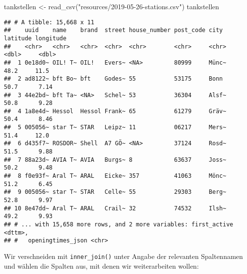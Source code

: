 \documentclass[
  ngerman,
]{article}
\newenvironment{Shaded}{\begin{snugshade}}{\end{snugshade}}
\newcommand{\FunctionTok}[1]{\textcolor[rgb]{0.00,0.00,0.00}{#1}}
\newcommand{\NormalTok}[1]{#1}
\newcommand{\OtherTok}[1]{\textcolor[rgb]{0.56,0.35,0.01}{#1}}
\newcommand{\StringTok}[1]{\textcolor[rgb]{0.31,0.60,0.02}{#1}}
\begin{document}
\begin{Shaded}
\begin{Highlighting}[]
\NormalTok{tankstellen }\OtherTok{\textless{}{-}} \FunctionTok{read\_csv}\NormalTok{(}\StringTok{"resources/2019{-}05{-}26{-}stations.csv"}\NormalTok{)}
\NormalTok{tankstellen}
\end{Highlighting}
\end{Shaded}

\begin{verbatim}
## # A tibble: 15,668 x 11
##    uuid    name    brand  street house_number post_code city  latitude longitude
##    <chr>   <chr>   <chr>  <chr>  <chr>        <chr>     <chr>    <dbl>     <dbl>
##  1 0e18d0~ OIL! T~ OIL!   Evers~ <NA>         80999     Münc~     48.2     11.5 
##  2 ad8122~ bft Bo~ bft    Godes~ 55           53175     Bonn      50.7      7.14
##  3 44e2bd~ bft Ta~ <NA>   Schel~ 53           36304     Alsf~     50.8      9.28
##  4 1a8e4d~ Hessol  Hessol Frank~ 65           61279     Gräv~     50.4      8.46
##  5 005056~ star T~ STAR   Leipz~ 11           06217     Mers~     51.4     12.0 
##  6 d435f7~ ROSDOR~ Shell  A7 GÖ~ <NA>         37124     Rosd~     51.5      9.88
##  7 88a23d~ AVIA T~ AVIA   Burgs~ 8            63637     Joss~     50.2      9.48
##  8 f0e93f~ Aral T~ ARAL   Eicke~ 357          41063     Mönc~     51.2      6.45
##  9 005056~ star T~ STAR   Celle~ 55           29303     Berg~     52.8      9.97
## 10 8e47dd~ Aral T~ ARAL   Crail~ 32           74532     Ilsh~     49.2      9.93
## # ... with 15,658 more rows, and 2 more variables: first_active <dttm>,
## #   openingtimes_json <chr>
\end{verbatim}

Wir verschneiden mit \texttt{inner\_join()} unter Angabe der relevanten Spaltennamen und wählen die Spalten aus, mit denen wir weiterarbeiten wollen:
\end{document}
